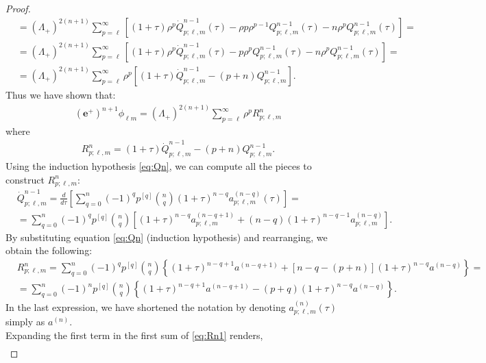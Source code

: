 \begin{proof}
\begin{align}
    & = (\Lambda_{+})^{2(n+1)} \sum_{p=\ell}^{\infty} \left[(1+\tau) \rho^{p} \dot{Q}_{p;\ell,m}^{n-1}(\tau)-\rho p \rho^{p-1} Q_{p;\ell,m}^{n-1}(\tau) - n \rho^{p}Q^{n-1}_{p;\ell,m}(\tau)\right] = \nonumber \\
    & = (\Lambda_{+})^{2(n+1)} \sum_{p=\ell}^{\infty} \left[(1+\tau) \rho^{p}\dot{Q}_{p;\ell,m}^{n-1}(\tau)-p \rho^{p} Q^{n-1}_{p;\ell,m}(\tau) - n \rho^{p}Q^{n-1}_{p;\ell,m}(\tau)\right] = \nonumber \\
    & = (\Lambda_{+})^{2(n+1)} \sum_{p=\ell}^{\infty} \rho^{p} \left[(1+\tau)\dot{Q}^{n-1}_{p;\ell,m}-(p+n)Q^{n-1}_{p;\ell,m}\right].
  \end{align}
  Thus we have shown that:
  \begin{align}\label{eq:inductionNp2step3}
    (\boldsymbol{e}^+)^{n+1}\phi_{\ell m} = (\Lambda_{+})^{2(n+1)} \sum_{p=\ell}^{\infty} \rho^{p}  R^{n}_{p;\ell,m}
  \end{align}
  where 
  \begin{align}\label{eq:QNrecursive}
    R^{n}_{p;\ell,m}=(1+\tau)\dot{Q}^{n-1}_{p;\ell,m}-(p+n)Q^{n-1}_{p;\ell,m}.
  \end{align}
  Using the induction hypothesis \eqref{eq:Qn}, we can compute all the pieces to construct $R^{n}_{p;\ell,m}$:
  \begin{align}\label{eq:Qndot}
    & \dot{Q}_{p;\ell,m}^{n-1} = \frac{d}{d \tau}\left[\sum_{q=0}^{n}(-1)^{q} p^{[q]}{n \choose q}(1+\tau)^{n-q}a_{p;\ell,m}^{(n-q)}(\tau)\right] = \nonumber \\
    & = \sum_{q=0}^{n}(-1)^{q} p^{[q]}{n \choose q} \left[(1+\tau)^{n-q} a_{p;\ell,m}^{(n-q+1)} +(n-q)(1+\tau)^{n-q-1} a_{p;\ell,m}^{(n-q)}\right].
  \end{align}
By substituting equation \eqref{eq:Qn} (induction hypothesis) and rearranging, we obtain the following:
  \begin{align}\label{eq:Rn1}
    & R^{n}_{p;\ell,m} = \sum_{q=0}^{n}(-1)^{q} p^{[q]}{n \choose q}\left\{(1+\tau)^{n-q+1} a^{(n-q+1)}+[n-q-(p+n)](1+\tau)^{n-q} a^{(n-q)}\right\} = \nonumber \\
    & =\sum_{q=0}^{n}(-1)^{n}p^{[q]}{n \choose q}\left\{(1+\tau)^{n-q+1} a^{(n-q+1)}-(p+q)(1+\tau)^{n-q} a^{(n-q)}\right\}.
  \end{align}
  In the last expression, we have shortened the notation by denoting $a^{(n)}_{p;\ell,m}(\tau)$ simply as $a^{(n)}$.\\
  Expanding the first term in the first sum of \eqref{eq:Rn1} renders,
  \begin{align}\label{eq:Rn2}

\end{align}
\end{proof}
